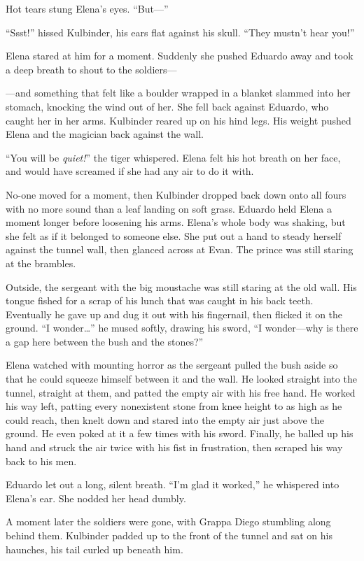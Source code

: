 \documentclass[10pt]{book}
\begin{document}
Hot tears stung Elena's eyes. ``But---''

``Ssst!'' hissed Kulbinder, his ears flat against his skull. ``They mustn't hear you!''

Elena stared at him for a moment. Suddenly she pushed Eduardo away and took a deep breath to shout to the soldiers---

---and something that felt like a boulder wrapped in a blanket slammed into her stomach, knocking the wind out of her. She fell back against Eduardo, who caught her in her arms. Kulbinder reared up on his hind legs. His weight pushed Elena and the magician back against the wall.

``You will be \emph{quiet!}'' the tiger whispered. Elena felt his hot breath on her face, and would have screamed if she had any air to do it with.

No-one moved for a moment, then Kulbinder dropped back down onto all fours with no more sound than a leaf landing on soft grass. Eduardo held Elena a moment longer before loosening his arms. Elena's whole body was shaking, but she felt as if it belonged to someone else. She put out a hand to steady herself against the tunnel wall, then glanced across at Evan. The prince was still staring at the brambles.

Outside, the sergeant with the big moustache was still staring at the old wall. His tongue fished for a scrap of his lunch that was caught in his back teeth. Eventually he gave up and dug it out with his fingernail, then flicked it on the ground. ``I wonder{\ldots}'' he mused softly, drawing his sword, ``I wonder---why is there a gap here between the bush and the stones?''

Elena watched with mounting horror as the sergeant pulled the bush aside so that he could squeeze himself between it and the wall. He looked straight into the tunnel, straight at them, and patted the empty air with his free hand. He worked his way left, patting every nonexistent stone from knee height to as high as he could reach, then knelt down and stared into the empty air just above the ground. He even poked at it a few times with his sword. Finally, he balled up his hand and struck the air twice with his fist in frustration, then scraped his way back to his men.

Eduardo let out a long, silent breath. ``I'm glad it worked,'' he whispered into Elena's ear. She nodded her head dumbly.

A moment later the soldiers were gone, with Grappa Diego stumbling along behind them. Kulbinder padded up to the front of the tunnel and sat on his haunches, his tail curled up beneath him.
\end{document}
